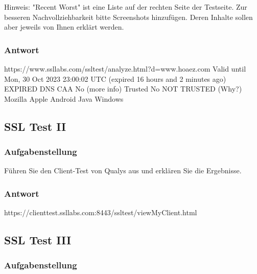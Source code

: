 \documentclass{article}
\begin{document}
Hinweis: "Recent Worst" ist eine Liste auf der rechten Seite der Testseite. Zur
besseren Nachvollziehbarkeit bitte Screenshots hinzufügen. Deren Inhalte sollen
aber jeweils von Ihnen erklärt werden.

\subsubsection*{Antwort}



https://www.ssllabs.com/ssltest/analyze.html?d=www.hoaez.com
Valid until 	Mon, 30 Oct 2023 23:00:02 UTC (expired 16 hours and 2 minutes ago)   EXPIRED
DNS CAA 	No (more info)
Trusted 	No   NOT TRUSTED (Why?)
Mozilla  Apple  Android  Java  Windows  


\newpage

\subsection{SSL Test II}

\subsubsection*{Aufgabenstellung}

Führen Sie den Client-Test von Qualys aus und erklären Sie die Ergebnisse.

\subsubsection*{Antwort}

https://clienttest.ssllabs.com:8443/ssltest/viewMyClient.html

\newpage

\subsection{SSL Test III}

\subsubsection*{Aufgabenstellung}
\end{document}
